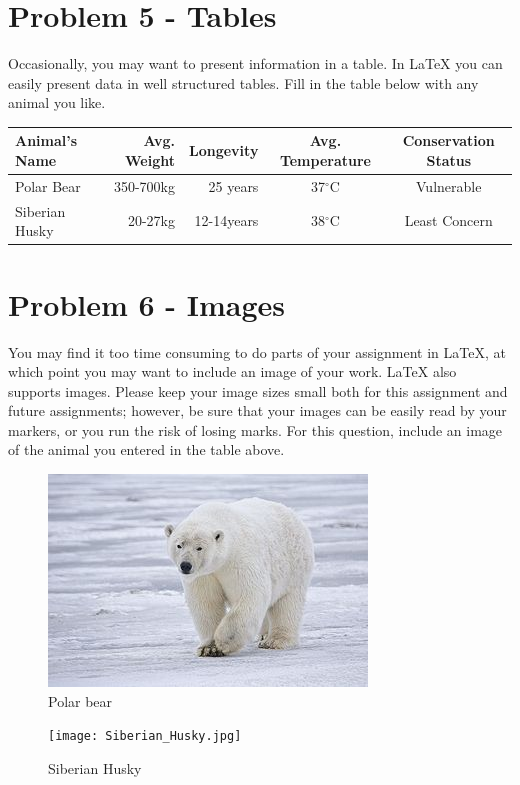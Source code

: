 \documentclass[12pt]{article}
\begin{document}
\section*{Problem 5 - Tables}
Occasionally, you may want to present information in a table. In \LaTeX{} you can easily
 present data in well structured tables. 
Fill in the table below with any animal you like.\\

 

\begin{tabular}{ | l || r  | r | c | c |} \hline
  Animal's Name & Avg. Weight & Longevity & Avg. Temperature & Conservation Status  \\ \hline
   Polar Bear & 350-700kg & 25 years & 37$^{\circ}$C  & Vulnerable \\ \hline
   Siberian Husky & 20-27kg & 12-14years & 38$^{\circ}$C &  Least Concern \\ \hline
\end{tabular}

\section*{Problem 6 - Images}
You may find it too time consuming to do parts of your assignment in \LaTeX{}, at which 
point you may want to include an image of your work. \LaTeX{} also supports images. 
Please keep your image sizes small both for this assignment and future assignments; 
however, be sure that your images can be easily read by your markers, or you run the 
risk of losing marks. For this question, include an image of the animal you entered
in the table above.\\


\begin{figure}
\begin{center}
        \includegraphics[scale=0.5]{polar_bear.jpg}
\end{center}
\caption{\label{figcaption} Polar bear}
\end{figure}


\begin{figure}
\begin{center}
        \texttt{[image: Siberian\_Husky.jpg]}
\end{center}
\caption{\label{figcaption} Siberian Husky}
\end{figure}
\end{document}
